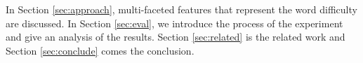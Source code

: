 In Section \ref{sec:approach}, multi-faceted features that represent the word difficulty are discussed. 
In Section \ref{sec:eval}, we introduce the process of the experiment and give an analysis of the results.
Section \ref{sec:related} is the related work and Section \ref{sec:conclude} comes the conclusion.
